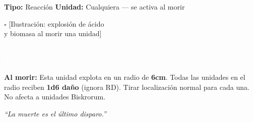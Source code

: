 \begin{center}
\begin{tcbitemize}
\tcbitem[title={\textbf{COLAPSO DE BIOMASA} \hfill \textcolor{white}{\small Ofensivo}}]

    {\fontsize{6.5}{7}\selectfont
    \textbf{Tipo:} Reacción \hfill \textbf{Unidad:} Cualquiera — se activa al morir}
    \vspace{2pt}

    \begin{tcolorbox}[colback=ChromeGray!15, colframe=ChromeGray!40, height=2.5cm,
                      halign=center, valign=center, sharp corners, size=small, nobeforeafter]
        \textcolor{ChromeGray}{\fontsize{7}{8}\selectfont $\square$ [Ilustración: explosión de ácido\\ y biomasa al morir una unidad]}
    \end{tcolorbox}

    \vfill

    \noindent
    \begin{minipage}[b]{0.22\linewidth}
        \begin{tcolorbox}[colback=BloodPurple, colframe=VoidBlack, sharp corners,
                          halign=center, valign=center, boxsep=0pt,
                          left=0pt, right=0pt, top=0pt, bottom=0pt,
                          nobeforeafter, height=1.9cm]
            \textcolor{white}{\fontsize{5.5}{6}\selectfont COSTO PE\\[3pt] \Large \textbf{0}}
        \end{tcolorbox}
    \end{minipage}%
    \hfill
    \begin{minipage}[b]{0.75\linewidth}
        \begin{tcolorbox}[colback=white, colframe=VoidPurple, sharp corners, boxrule=0.5pt,
                          left=2pt, right=2pt, top=2pt, bottom=2pt,
                          nobeforeafter, height=1.4cm]
            \fontsize{6}{7}\selectfont
            \textbf{Al morir:} Esta unidad explota en un radio de \textbf{6cm}. Todas las unidades en el radio reciben \textbf{1d6 daño} (ignora RD). Tirar localización normal para cada una. No afecta a unidades Biskrorum.
        \end{tcolorbox}
        \vspace{2pt}
        \begin{center}
            \fontsize{5.5}{6}\selectfont \itshape
            \textcolor{VoidPurple}{``La muerte es el último disparo.''}
        \end{center}
    \end{minipage}

\end{tcbitemize}
\end{center}

